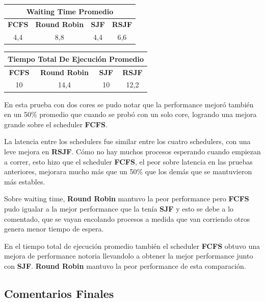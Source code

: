 \begin{center}
	\begin{tabular}{|c|c|c|c|}
		\hline
		\multicolumn{4}{|c|}{\large{\textbf{Waiting Time Promedio}}} \\
		\hline
		\textbf{FCFS} & \textbf{Round Robin} & \textbf{SJF} & \textbf{RSJF} \\
		\hline
		4,4 & 8,8 & 4,4 & 6,6 \\
		\hline
	\end{tabular}
\end{center}

\begin{center}
	\begin{tabular}{|c|c|c|c|}
		\hline
		\multicolumn{4}{|c|}{\large{\textbf{Tiempo Total De Ejecución Promedio}}} \\
		\hline
		\textbf{FCFS} & \textbf{Round Robin} & \textbf{SJF} & \textbf{RSJF} \\
		\hline
		10 & 14,4 & 10 & 12,2 \\
		\hline
	\end{tabular}
\end{center}

En esta prueba con dos cores se pudo notar que la performance mejoró también en un 50\% promedio que cuando se probó con un solo core, logrando una mejora grande sobre el scheduler \textbf{FCFS}.

La latencia entre los schedulers fue similar entre los cuatro schedulers, con una leve mejora en \textbf{RSJF}. Cómo no hay muchos procesos esperando cuando empiezan a correr, esto hizo que el scheduler \textbf{FCFS}, el peor sobre latencia en las pruebas anteriores, mejorara mucho más que un 50\% que los demás que se mantuvieron más estables.

Sobre waiting time, \textbf{Round Robin} mantuvo la peor performance pero \textbf{FCFS} pudo igualar a la mejor performance que la tenía \textbf{SJF} y esto se debe a lo comentado, que se vayan encolando procesos a medida que van corriendo otros genera menor tiempo de espera.

En el tiempo total de ejecución promedio también el scheduler \textbf{FCFS} obtuvo una mejora de performance notoria llevandolo a obtener la mejor performance junto con \textbf{SJF}. \textbf{Round Robin} mantuvo la peor performance de esta comparación.

\subsection{Comentarios Finales}

